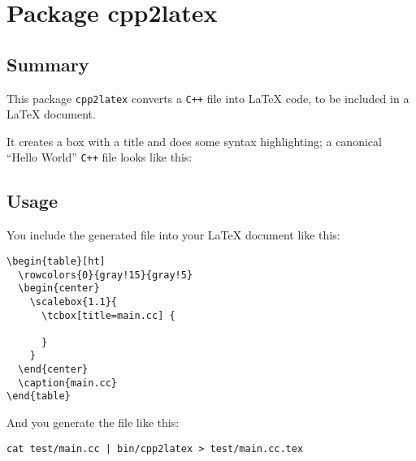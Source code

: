 \documentclass[
  fontsize=12pt  %
 ,headinclude    %
 ,headsepline    %
]{scrbook}       %
\begin{document}
\setcounter{chapter}{0}
\setcounter{section}{0}

\chapter{Package cpp2latex}
\section{Summary}
\begin{flushleft}
This package \texttt{cpp2latex} converts a \texttt{C++} file into
\LaTeX {} code, to be included in a \LaTeX {} document.

It creates a box with a title and does some syntax highlighting;
a canonical ``Hello World'' \texttt{C++} file
looks like this:

\end{flushleft}

\begin{table}[ht]
  \begin{center}
    \scalebox{1.1}{
      \tcbox[title=main.cc] {
        
      }
    }
  \end{center}
  \caption{main.cc}
\end{table}

\section{Usage}

You include the generated file into your \LaTeX {} document like this:\newpage
\begin{verbatim}
\begin{table}[ht]
  \rowcolors{0}{gray!15}{gray!5}
  \begin{center}
    \scalebox{1.1}{
      \tcbox[title=main.cc] {
        
      }
    }
  \end{center}
  \caption{main.cc}
\end{table}
\end{verbatim}

And you generate the file like this:\\

\begin{verbatim}
cat test/main.cc | bin/cpp2latex > test/main.cc.tex
\end{verbatim}

\end{document}
